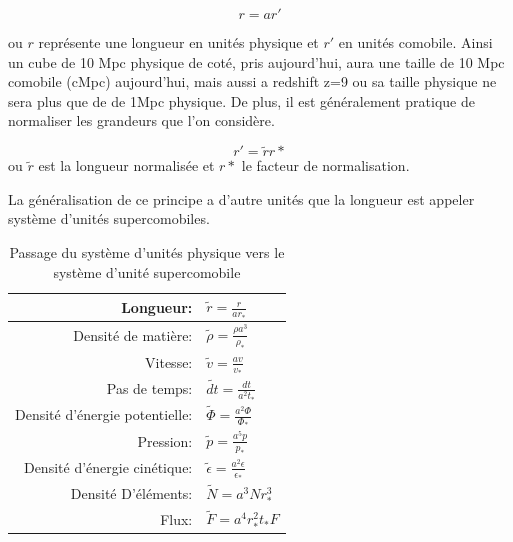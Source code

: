 \begin{equation}
r=a r'
\end{equation}

ou $r$ représente une longueur en unités physique et $r'$ en unités comobile.
Ainsi un cube de 10 Mpc physique de coté, pris aujourd'hui, aura une taille de 10 Mpc comobile (cMpc) aujourd'hui, mais aussi a redshift z=9 ou sa taille physique ne sera plus que de de 1Mpc physique.
De plus, il est généralement pratique de normaliser les grandeurs que l'on considère. 

\begin{equation}
r'=\tilde{r}r*
\end{equation}
ou $\tilde{r}$ est la longueur normalisée et $r*$ le facteur de normalisation.

La généralisation de ce principe a d'autre unités que la longueur est appeler système d'unités supercomobiles.
\citep{martel_convenient_1998}

\begin{table}[htbp]
\begin{center}
\begin{tabular}{r l} \hline 
Longueur: & $\tilde{r}=\frac{r}{ar_*}$ \\ \hline 
Densité de matière: & $\tilde{\rho}=\frac{\rho a^3}{\rho_*}$ \\ \hline 
Vitesse: & $ \tilde{v}=\frac{av}{v_*}$ \\ \hline 
Pas de temps: & $\tilde{dt}=\frac{dt}{a^2t_*}$\\ \hline 
Densité d’énergie potentielle: & $\tilde{\Phi}=\frac{a^2 \Phi}{\Phi_*}$\\ \hline 
Pression: & $\tilde{p}=\frac{a^5 p}{p_*}$\\ \hline 
Densité d’énergie cinétique: & $\tilde{\epsilon}=\frac{a^2 \epsilon}{\epsilon_*}$\\ \hline 
Densité D’éléments: & $\tilde{N}=a^3 N r_*^3$\\ \hline 
Flux: & $\tilde{F}=a^4 r_*^2 t_* F$\\ \hline 
\end{tabular} 
\end{center}
\caption[Système d'unité supercomobile]{Passage du système d'unités physique vers le système d'unité supercomobile} 
\end{table}

